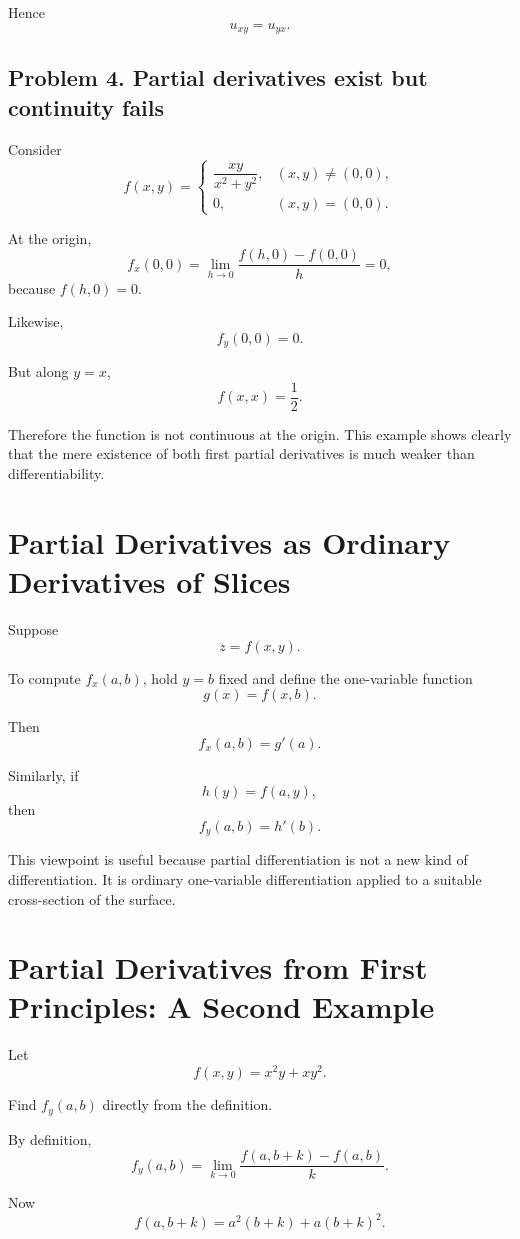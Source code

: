 \documentclass[11pt,oneside]{book}
\theoremstyle{studentthm}
\theoremstyle{definition}
\begin{document}
Hence
\[
u_{xy}=u_{yx}.
\]

\subsection*{Problem 4. Partial derivatives exist but continuity fails}

Consider
\[
f(x,y)
=
\begin{cases}
\dfrac{xy}{x^2+y^2},&(x,y)\ne(0,0),\\
0,&(x,y)=(0,0).
\end{cases}
\]

At the origin,
\[
f_x(0,0)
=
\lim_{h\to0}
\frac{f(h,0)-f(0,0)}{h}
=0,
\]
because \(f(h,0)=0\).

Likewise,
\[
f_y(0,0)=0.
\]

But along \(y=x\),
\[
f(x,x)=\frac12.
\]

Therefore the function is not continuous at the origin. This example
shows clearly that the mere existence of both first partial derivatives
is much weaker than differentiability.



\section{Partial Derivatives as Ordinary Derivatives of Slices}

Suppose
\[
z=f(x,y).
\]

To compute \(f_x(a,b)\), hold \(y=b\) fixed and define the one-variable
function
\[
g(x)=f(x,b).
\]

Then
\[
f_x(a,b)=g'(a).
\]

Similarly, if
\[
h(y)=f(a,y),
\]
then
\[
f_y(a,b)=h'(b).
\]

This viewpoint is useful because partial differentiation is not a new
kind of differentiation. It is ordinary one-variable differentiation
applied to a suitable cross-section of the surface.

\section{Partial Derivatives from First Principles: A Second Example}

Let
\[
f(x,y)=x^2y+xy^2.
\]

Find \(f_y(a,b)\) directly from the definition.

By definition,
\[
f_y(a,b)
=
\lim_{k\to0}
\frac{
f(a,b+k)-f(a,b)
}{k}.
\]

Now
\[
f(a,b+k)
=
a^2(b+k)+a(b+k)^2.
\]
\end{document}
